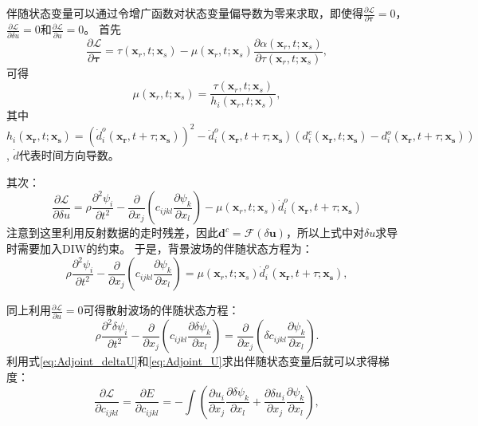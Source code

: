 伴随状态变量可以通过令增广函数对状态变量偏导数为零来求取，即使得$\frac{\partial \mathcal{L}}{\partial \mathbf{\tau}}=0$，
$\frac{\partial \mathcal{L}}{\partial \delta u}=0$和$\frac{\partial \mathcal{L}}{\partial 
	u}=0$。
首先
\begin{equation}
	\frac{\partial \mathcal{L}}{\partial \mathbf{\tau}}=\tau(\mathbf{x}_r,t;\mathbf{x}_s)
	-\mu(\mathbf{x}_r,t;\mathbf{x}_s)\frac{\partial \alpha(\mathbf{x}_r,t;\mathbf{x}_s)}{\partial \tau(\mathbf{x}_r,t;\mathbf{x}_s)},
        \label{eq:PartialTau}
\end{equation}
可得
\begin{equation}
	\mu(\mathbf{x}_r,t;\mathbf{x}_s)=\frac{\tau(\mathbf{x}_r,t;\mathbf{x}_s)}{ h_i(\mathbf{x}_r,t;\mathbf{x}_s)},
        \label{eq:AdjointTau}
\end{equation}
其中$h_i(\mathbf{x_r},t;\mathbf{x_s})=(\dot{d}^o_i(\mathbf{x_r},t+\tau;\mathbf{x_s}))^2-\ddot{d}^o_i(\mathbf{x_r},t+\tau;\mathbf{x_s})
(d^c_i(\mathbf{x_r},t;\mathbf{x_s})-d^o_i(\mathbf{x_r},t+\tau;\mathbf{x_s}))$, $\dot{d}$代表时间方向导数。

其次：
\begin{equation}
	\frac{\partial \mathcal{L}}{\partial \delta u}=
	\rho\frac{\partial^2 {\psi}_i }{\partial t^2}
	-\frac{\partial}{\partial x_j}(c_{ijkl}\frac{\partial {\psi}_k}{\partial x_l})-\mu(\mathbf{x}_r,t;\mathbf{x}_s)
	\dot{d}^o_i(\mathbf{x_r},t+\tau;\mathbf{x_s})
        \label{eq:Partial_U}
\end{equation}
注意到这里利用反射数据的走时残差，因此$\mathbf{d}^c=\mathcal{F}(\delta
\mathbf{u})$，所以上式中对$\delta u$求导时需要加入DIW的约束。
于是，背景波场的伴随状态方程为：
\begin{equation}
	\rho\frac{\partial^2 {\psi}_i }{\partial t^2}
	-\frac{\partial}{\partial x_j}(c_{ijkl}\frac{\partial {\psi}_k}{\partial x_l})=\mu(\mathbf{x}_r,t;\mathbf{x}_s)
	\dot{d}^o_i(\mathbf{x_r},t+\tau;\mathbf{x_s}),
        \label{eq:Adjoint_deltaU}
\end{equation}

同上利用$\frac{\partial \mathcal{L}}{\partial u}=0$可得散射波场的伴随状态方程：
\begin{equation}
	\rho\frac{\partial^2 \delta {\psi}_i }{\partial t^2}
	-\frac{\partial}{\partial x_j}(c_{ijkl}\frac{\partial \delta {\psi}_k}{\partial x_l})=
	\frac{\partial}{\partial x_j}(\delta c_{ijkl}\frac{\partial {\psi}_k}{\partial x_l}).
        \label{eq:Adjoint_U}
\end{equation}
利用式\eqref{eq:Adjoint_deltaU}和\eqref{eq:Adjoint_U}求出伴随状态变量后就可以求得梯度：
\begin{equation}
	\frac{\partial \mathcal{L}}{\partial c_{ijkl}}=
    \frac{\partial E}{\partial c_{ijkl}}=-\int (\frac{\partial u_{i}}{\partial
    x_j}\frac{\partial \delta{\psi}_{k}}{\partial x_l}+\frac{\partial \delta {u}_{i}}{\partial
    x_j}\frac{\partial \psi_{k}}{\partial x_l}),
    \label{eq:GradientCijkl1}
\end{equation}

